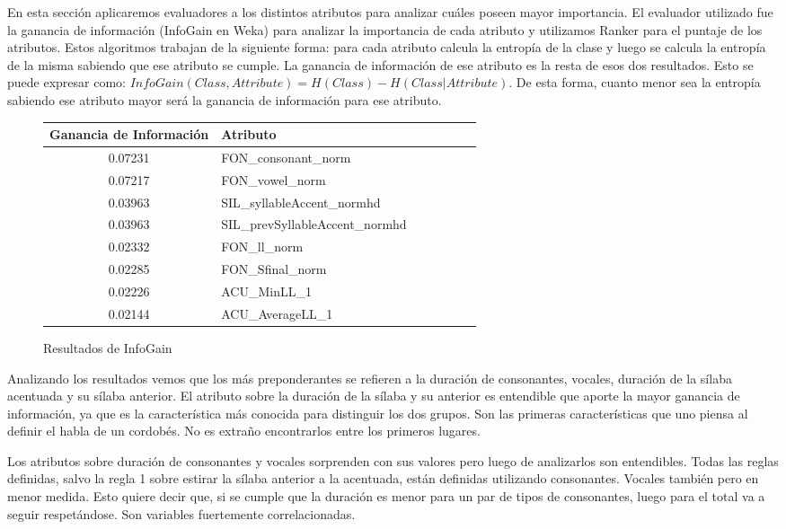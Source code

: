 En esta sección aplicaremos evaluadores a los distintos atributos para analizar cuáles poseen mayor importancia. El evaluador utilizado fue la ganancia de información (InfoGain en Weka) para analizar la importancia de cada atributo y utilizamos Ranker para el puntaje de los atributos. Estos algoritmos trabajan de la siguiente forma: para cada atributo calcula la entropía de la clase y luego se calcula la entropía de la misma sabiendo que ese atributo se cumple. La ganancia de información de ese atributo es la resta de esos dos resultados. Esto se puede expresar como: $InfoGain(Class,Attribute) = H(Class) - H(Class | Attribute)$. De esta forma, cuanto menor sea la entropía sabiendo ese atributo mayor será la ganancia de información para ese atributo.
\begin{figure}[H]
\begin{table}[H]
\centering
\begin{tabular}{|c|l|c|c|c|c|c|}
\hline
\textbf{Ganancia de Información} & \textbf{Atributo} \\ \hline
 0.07231     & FON\_consonant\_norm \\ \hline
 0.07217     & FON\_vowel\_norm \\ \hline
 0.03963     & SIL\_syllableAccent\_normhd \\ \hline
 0.03963     & SIL\_prevSyllableAccent\_normhd \\ \hline
 0.02332     & FON\_ll\_norm \\ \hline
 0.02285     & FON\_Sfinal\_norm \\ \hline
 0.02226     & ACU\_MinLL\_1 \\ \hline
 0.02144     & ACU\_AverageLL\_1 \\ \hline
\end{tabular}
\end{table}
\label{infogain}
\caption{Resultados de InfoGain}
\end{figure}

Analizando los resultados vemos que los más preponderantes se refieren a la duración de consonantes, vocales, duración de la sílaba acentuada y su sílaba anterior. El atributo sobre la duración de la sílaba y su anterior es entendible que aporte la mayor ganancia de información, ya que es la característica más conocida para distinguir los dos grupos. Son las primeras características que uno piensa al definir el habla de un cordobés. No es extraño encontrarlos entre los primeros lugares. 

Los atributos sobre duración de consonantes y vocales sorprenden con sus valores pero luego de analizarlos son entendibles. Todas las reglas definidas, salvo la regla 1 sobre estirar la sílaba anterior a la acentuada, están definidas utilizando consonantes. Vocales también pero en menor medida. Esto quiere decir que, si se cumple que la duración es menor para un par de tipos de consonantes, luego para el total va a seguir respetándose. Son variables fuertemente correlacionadas.

